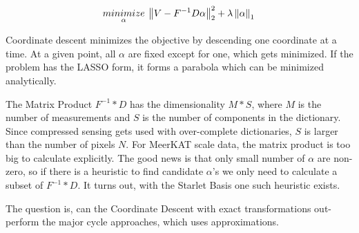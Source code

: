 \begin{equation}
\underset{\alpha}{minimize} \: \left \| V - F^{-1}D \alpha \right \|_2^2 + \lambda \left \| \alpha \right \|_1 \\
\end{equation}

Coordinate descent minimizes the objective by descending one coordinate at a time. At a given point, all $\alpha$ are fixed except for one, which gets minimized. If the problem has the LASSO form, it forms a parabola which can be minimized analytically.

The Matrix Product $F^{-1}*D$ has the dimensionality $M*S$, where $M$ is the number of measurements and $S$ is the number of components in the dictionary. Since compressed sensing gets used with over-complete dictionaries, $S$ is larger than the number of pixels $N$. For MeerKAT scale data, the matrix product is too big to calculate explicitly.  The good news is that only small number of $\alpha$ are non-zero, so if there is a heuristic to find candidate $\alpha$'s we only need to calculate a subset of $F^{-1}*D$. It turns out, with the Starlet Basis one such heuristic exists.

The question is, can the Coordinate Descent with exact transformations out-perform the major cycle approaches, which uses approximations.



